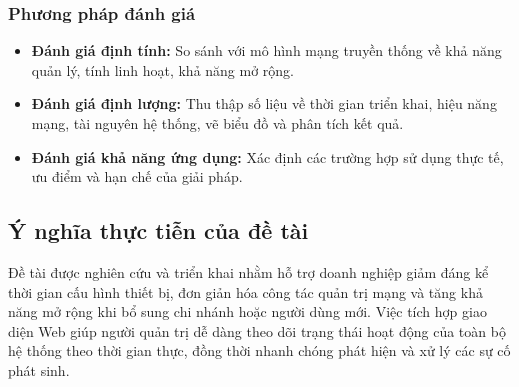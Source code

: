 \subsubsection{Phương pháp đánh giá}
\begin{itemize}
    \item \textbf{Đánh giá định tính:} So sánh với mô hình mạng truyền thống về khả năng quản lý, tính linh hoạt, khả năng mở rộng.
    \item \textbf{Đánh giá định lượng:} Thu thập số liệu về thời gian triển khai, hiệu năng mạng, tài nguyên hệ thống, vẽ biểu đồ và phân tích kết quả.
    \item \textbf{Đánh giá khả năng ứng dụng:} Xác định các trường hợp sử dụng thực tế, ưu điểm và hạn chế của giải pháp.
\end{itemize}
\subsection{Ý nghĩa thực tiễn của đề tài}
Đề tài được nghiên cứu và triển khai nhằm hỗ trợ doanh nghiệp giảm đáng kể thời gian cấu hình thiết bị, đơn giản hóa công tác quản trị mạng và tăng khả năng mở rộng khi bổ sung chi nhánh hoặc người dùng mới. Việc tích hợp giao diện Web giúp người quản trị dễ dàng theo dõi trạng thái hoạt động của toàn bộ hệ thống theo thời gian thực, đồng thời nhanh chóng phát hiện và xử lý các sự cố phát sinh.